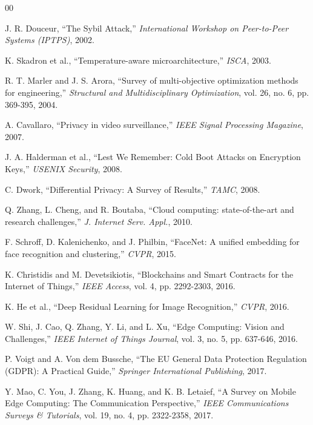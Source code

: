 \documentclass[conference]{IEEEtran}
\begin{document}
\begin{thebibliography}{00}

 J. R. Douceur, ``The Sybil Attack,'' \textit{International Workshop on Peer-to-Peer Systems (IPTPS)}, 2002.

 K. Skadron et al., ``Temperature-aware microarchitecture,'' \textit{ISCA}, 2003.

 R. T. Marler and J. S. Arora, ``Survey of multi-objective optimization methods for engineering,'' \textit{Structural and Multidisciplinary Optimization}, vol. 26, no. 6, pp. 369-395, 2004.

 A. Cavallaro, ``Privacy in video surveillance,'' \textit{IEEE Signal Processing Magazine}, 2007.

 J. A. Halderman et al., ``Lest We Remember: Cold Boot Attacks on Encryption Keys,'' \textit{USENIX Security}, 2008.

 C. Dwork, ``Differential Privacy: A Survey of Results,'' \textit{TAMC}, 2008.

 Q. Zhang, L. Cheng, and R. Boutaba, ``Cloud computing: state-of-the-art and research challenges,'' \textit{J. Internet Serv. Appl.}, 2010.

 F. Schroff, D. Kalenichenko, and J. Philbin, ``FaceNet: A unified embedding for face recognition and clustering,'' \textit{CVPR}, 2015.

 K. Christidis and M. Devetsikiotis, ``Blockchains and Smart Contracts for the Internet of Things,'' \textit{IEEE Access}, vol. 4, pp. 2292-2303, 2016.

 K. He et al., ``Deep Residual Learning for Image Recognition,'' \textit{CVPR}, 2016.

 W. Shi, J. Cao, Q. Zhang, Y. Li, and L. Xu, ``Edge Computing: Vision and Challenges,'' \textit{IEEE Internet of Things Journal}, vol. 3, no. 5, pp. 637-646, 2016.

 P. Voigt and A. Von dem Bussche, ``The EU General Data Protection Regulation (GDPR): A Practical Guide,'' \textit{Springer International Publishing}, 2017.

 Y. Mao, C. You, J. Zhang, K. Huang, and K. B. Letaief, ``A Survey on Mobile Edge Computing: The Communication Perspective,'' \textit{IEEE Communications Surveys \& Tutorials}, vol. 19, no. 4, pp. 2322-2358, 2017.


\end{thebibliography}
\end{document}
